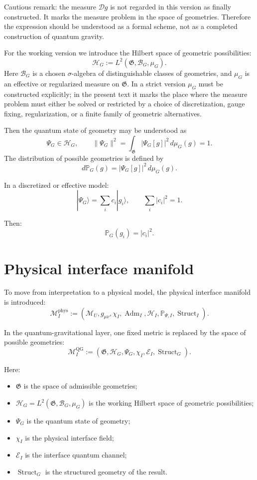 \documentclass[12pt,a4paper]{article}
\DeclareMathOperator{\Adm}{Adm}
\DeclareMathOperator{\Struct}{Struct}
\newcommand{\M}{\mathcal M_U}
\newcommand{\MIphys}{\mathcal M_I^{\mathrm{phys}}}
\newcommand{\MIQG}{\mathcal M_I^{\mathrm{QG}}}
\newcommand{\Gspace}{\mathfrak G}
\newcommand{\Hilb}{\mathcal H}
\newcommand{\Prob}{\mathbb P}
\newcommand{\D}{\mathcal D}
\newcommand{\BorelG}{\mathcal B_G}
\begin{document}
Cautious remark: the measure $\D g$ is not regarded in this version as finally constructed. It marks the measure problem in the space of geometries. Therefore the expression should be understood as a formal scheme, not as a completed construction of quantum gravity.

For the working version we introduce the Hilbert space of geometric possibilities:
\[
\boxed{
\Hilb_G
:=
L^2(\Gspace,\BorelG,\mu_G).
}
\]
Here $\BorelG$ is a chosen $\sigma$-algebra of distinguishable classes of geometries, and $\mu_G$ is an effective or regularized measure on $\Gspace$. In a strict version $\mu_G$ must be constructed explicitly; in the present text it marks the place where the measure problem must either be solved or restricted by a choice of discretization, gauge fixing, regularization, or a finite family of geometric alternatives.

Then the quantum state of geometry may be understood as
\[
\Psi_G\in\Hilb_G,
\qquad
\|\Psi_G\|^2
=
\int_{\Gspace}|\Psi_G[g]|^2\,d\mu_G(g)=1.
\]
The distribution of possible geometries is defined by
\[
\boxed{
d\Prob_G(g)=|\Psi_G[g]|^2\,d\mu_G(g).
}
\]

In a discretized or effective model:
\[
\boxed{
|\Psi_G\rangle
=
\sum_i c_i |g_i\rangle,
\qquad
\sum_i |c_i|^2=1.
}
\]

Then:
\[
\boxed{
\Prob_G(g_i)=|c_i|^2.
}
\]

\section{Physical interface manifold}

To move from interpretation to a physical model, the physical interface manifold is introduced:
\[
\boxed{
\MIphys
:=
(\M,g_{\mu\nu},\chi_I,\Adm_I,\Hilb_I,\Prob_{\Psi,I},\Struct_I).
}
\]

In the quantum-gravitational layer, one fixed metric is replaced by the space of possible geometries:
\[
\boxed{
\MIQG
:=
(\Gspace,\Hilb_G,\Psi_G,\chi_I,\mathcal E_I,\Struct_G).
}
\]

Here:
\begin{itemize}[leftmargin=2em]
    \item $\Gspace$ is the space of admissible geometries;
    \item $\Hilb_G=L^2(\Gspace,\BorelG,\mu_G)$ is the working Hilbert space of geometric possibilities;
    \item $\Psi_G$ is the quantum state of geometry;
    \item $\chi_I$ is the physical interface field;
    \item $\mathcal E_I$ is the interface quantum channel;
    \item $\Struct_G$ is the structured geometry of the result.
\end{itemize}
\end{document}
